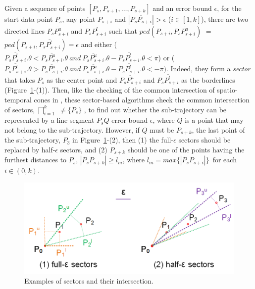 Given a sequence of points $[P_{s}, P_{s+1}, \ldots, P_{s+k}]$ and an error bound $\epsilon$,
for the start data point $P_s$, any point $P_{s+i}$ and $|\overline{P_sP_{s+i}}|>\epsilon$ ($i\in[1, k]$), there are two directed lines $\overline{P_sP^u_{s+i}}$ and $\overline{P_sP^l_{s+i}}$ such that $ped(P_{s+i}, \overline{P_sP^u_{s+i}})$ $=$ $ped(P_{s+i}, \overline{P_sP^l_{s+i}}) = \epsilon$ and either ($\overline{P_sP^l_{s+i}}.\theta < \overline{P_sP^u_{s+i}}.\theta ~and~\overline{P_sP^u_{s+i}}.\theta - \overline{P_sP^l_{s+i}}.\theta <\pi$) or ($\overline{P_sP^l_{s+i}}.\theta > \overline{P_sP^u_{s+i}}.\theta ~and~ \overline{P_sP^u_{s+i}}.\theta - \overline{P_sP^l_{s+i}}.\theta < -\pi)$. Indeed, they form a \emph{sector}  that takes $P_s$ as the center point and $\overline{P_sP^u_{s+i}}$ and $\overline{P_sP^l_{s+i}}$ as the borderlines (Figure~\ref{fig:sleeve}-(1)).
%
Then, like the checking of the common intersection of spatio-temporal cones in \cised, these sector-based algorithms check the common intersection of sectors, \ie $\bigsqcap_{i=1}^{k}$ $\ne \{P_s\}$ \cite{Williams:Longest, Sklansky:Cone,Zhao:Sleeve}, to find out whether the sub-trajectory can be represented by a line segment $\overline{P_sQ}$ \wrt error bound $\epsilon$, where $Q$ is a point that may not belong to the sub-trajectory. However, if $Q$ must be $P_{s+k}$, the last point of the sub-trajectory, \eg $P_3$ in Figure~\ref{fig:sleeve}-(2), then (1) the full-$\epsilon$ sectors should be replaced by half-$\epsilon$ sectors, and (2) $P_{s+k}$ should be one of the points having the furthest distances to $P_s$, \ie $|P_sP_{s+k}| \ge l_{m}$, where $l_{m}=max\{|P_sP_{s+i}|\}$~for each $i \in (0, k)$. 
%

\begin{figure}[tb!]
	\centering
	\includegraphics[scale=1.0]{figures/Fig-Sleeve.png}
	\vspace{-2ex}
	\caption{\small Examples of sectors and their intersection.}
	\vspace{-2ex}
	\label{fig:sleeve}
\end{figure}


